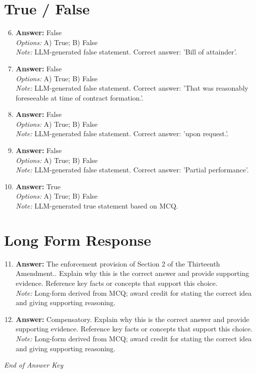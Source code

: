 \documentclass[12pt]{article}
\begin{document}
\section*{True / False}
\begin{enumerate}[label=\arabic*.]
\setcounter{enumi}{5}
\item \textbf{Answer:} False
\\ \textit{Options:} A) True; B) False
\\ \textit{Note:} LLM-generated false statement. Correct answer: 'Bill of attainder'.
\item \textbf{Answer:} False
\\ \textit{Options:} A) True; B) False
\\ \textit{Note:} LLM-generated false statement. Correct answer: 'That was reasonably foreseeable at time of contract formation.'.
\item \textbf{Answer:} False
\\ \textit{Options:} A) True; B) False
\\ \textit{Note:} LLM-generated false statement. Correct answer: 'upon request.'.
\item \textbf{Answer:} False
\\ \textit{Options:} A) True; B) False
\\ \textit{Note:} LLM-generated false statement. Correct answer: 'Partial performance'.
\item \textbf{Answer:} True
\\ \textit{Options:} A) True; B) False
\\ \textit{Note:} LLM-generated true statement based on MCQ.
\end{enumerate}

\section*{Long Form Response}
\begin{enumerate}[label=\arabic*.]
\setcounter{enumi}{10}
\item \textbf{Answer:} The enforcement provision of Section 2 of the Thirteenth Amendment.. Explain why this is the correct answer and provide supporting evidence. Reference key facts or concepts that support this choice.
\\ \textit{Note:} Long-form derived from MCQ; award credit for stating the correct idea and giving supporting reasoning.
\item \textbf{Answer:} Compensatory. Explain why this is the correct answer and provide supporting evidence. Reference key facts or concepts that support this choice.
\\ \textit{Note:} Long-form derived from MCQ; award credit for stating the correct idea and giving supporting reasoning.
\end{enumerate}

\vfill
\noindent\textit{End of Answer Key}
\end{document}
